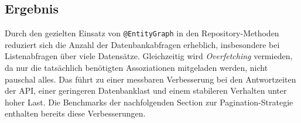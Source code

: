\subsection*{Ergebnis}
Durch den gezielten Einsatz von \texttt{@EntityGraph} in den Repository-Methoden reduziert sich die Anzahl der Datenbankabfragen erheblich, insbesondere bei Listenabfragen über viele Datensätze. 
Gleichzeitig wird \textit{Overfetching} vermieden, da nur die tatsächlich benötigten Assoziationen mitgeladen werden, nicht pauschal alles.
Das führt zu einer messbaren Verbesserung bei den Antwortzeiten der API, einer geringeren Datenbanklast und einem stabileren Verhalten unter hoher Last.
Die Benchmarks der nachfolgenden Section zur Pagination-Strategie enthalten bereits diese Verbesserungen.